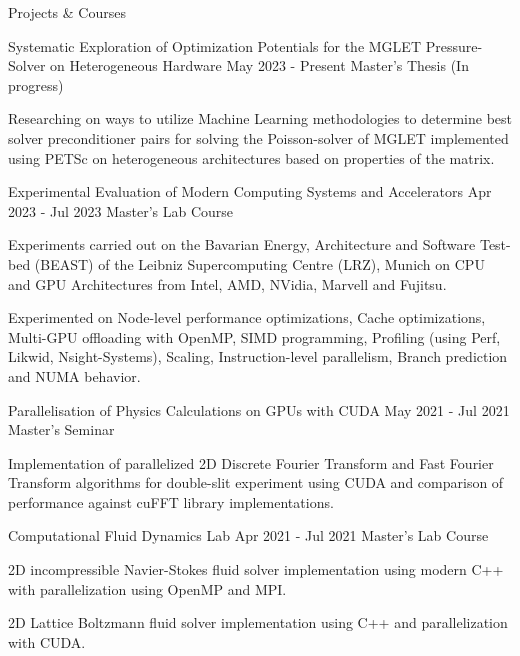 \documentclass[
	11pt, %
]{./../assets/resume} %
\begin{document}

\begin{rSection}{Projects \& Courses}

    \begin{rLongProject}
    {Systematic Exploration of Optimization Potentials for the MGLET} {Pressure-Solver on Heterogeneous Hardware}
    {May 2023 - Present} {Master's Thesis (In progress)} 
        \item 
        Researching on ways to utilize Machine Learning methodologies to determine best solver preconditioner pairs for solving the Poisson-solver of MGLET implemented using PETSc on heterogeneous architectures based on properties of the matrix.
    \end{rLongProject}

    \begin{rLongProject}
    {Experimental Evaluation of Modern Computing Systems and} {Accelerators}
    {Apr 2023 - Jul 2023} {Master's Lab Course}
        \item
        Experiments carried out on the Bavarian Energy, Architecture and Software Test-bed (BEAST) of the Leibniz Supercomputing Centre (LRZ), Munich on CPU and GPU Architectures from Intel, AMD, NVidia, Marvell and Fujitsu.
        \item
        Experimented on Node-level performance optimizations, Cache optimizations, Multi-GPU offloading with OpenMP, SIMD programming, Profiling (using Perf, Likwid, Nsight-Systems), Scaling, Instruction-level parallelism, Branch prediction and NUMA behavior. 
    \end{rLongProject}

    \begin{rShortProject}
    {Parallelisation of Physics Calculations on GPUs with CUDA}
    {May 2021 - Jul 2021} {Master's Seminar}
        \item
        Implementation of parallelized 2D Discrete Fourier Transform and Fast Fourier Transform algorithms for double-slit experiment using CUDA and comparison of performance against cuFFT library implementations.
    \end{rShortProject}

\newpage

    \begin{rShortProject}
    {Computational Fluid Dynamics Lab}
    {Apr 2021 - Jul 2021} {Master's Lab Course}
        \item
        2D incompressible Navier-Stokes fluid solver implementation using modern C++ with parallelization using OpenMP and MPI.
        \item
        2D Lattice Boltzmann fluid solver implementation using C++ and parallelization with CUDA.
    \end{rShortProject}


\end{rSection}
\end{document}
